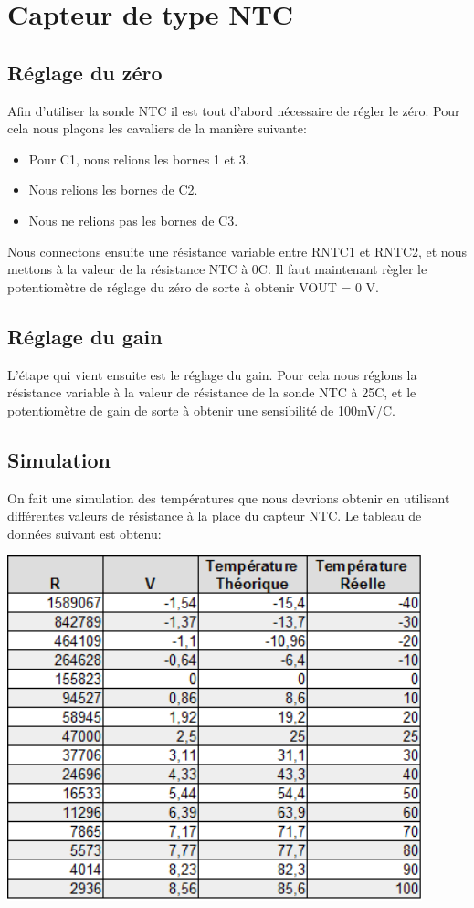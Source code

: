 \documentclass[a4paper,12pt]{article}
\begin{document}
  \section{Capteur de type NTC}
  		\subsection{Réglage du zéro}
			\par Afin d'utiliser la sonde NTC il est tout d'abord nécessaire de régler le zéro. Pour cela nous plaçons les cavaliers de la manière suivante:
      		\begin{itemize}
				\item Pour C1, nous relions les bornes 1 et 3.
				\item Nous relions les bornes de C2.
				\item Nous ne relions pas les bornes de C3.
			\end{itemize}
			\par Nous connectons ensuite une résistance variable entre RNTC1 et RNTC2, et nous mettons à la valeur de la résistance NTC à 0{\degre}C.
			Il faut maintenant règler le potentiomètre de réglage du zéro de sorte à obtenir VOUT = 0 V.

		\subsection{Réglage du gain}
			\par L'étape qui vient ensuite est le réglage du gain.
			Pour cela nous réglons la résistance variable à la valeur de résistance de la sonde NTC à 25{\degre}C, et le potentiomètre de gain de sorte à obtenir une sensibilité de 100mV/{\degre}C.

		\subsection{Simulation}
			\par On fait une simulation des températures que nous devrions obtenir en utilisant différentes valeurs de résistance à la place du capteur NTC.
			Le tableau de données suivant est obtenu:
			\begin{center}
				\includegraphics[width=12cm]{../Images/TabNTC.png}
			\end{center}
\end{document}
